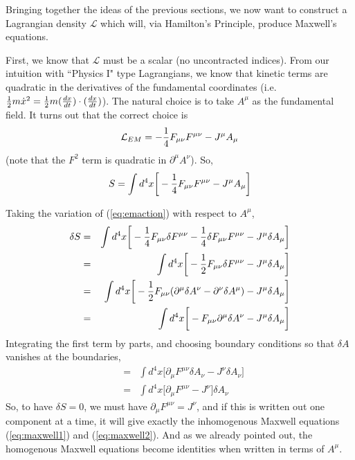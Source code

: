 \documentclass[12pt,epsf]{article}
\def\nolabel{\nonumber }
\def\nolabel{\nonumber }
\begin{document}
Bringing together the ideas of the previous sections, we now want to construct a
Lagrangian density $\mathcal{L}$ which will, via Hamilton's Principle,
produce Maxwell's equations.  

First, we know that $\mathcal{L}$ must be a scalar (no uncontracted
indices).  From our intuition with ``Physics I" type Lagrangians, we
know that kinetic terms are quadratic in the derivatives of the
fundamental coordinates (i.e. ${1\over 2} m\dot{x}^2 = {1\over 2} m
({dx \over dt})\cdot ({dx \over dt})$).  The natural choice is to take
$A^{\mu}$ as the fundamental field.  It turns out that the correct
choice is 
\begin{eqnarray}
\mathcal{L}_{EM} = -{1\over 4} F_{\mu \nu}F^{\mu \nu} - J^{\mu}A_{\mu}
\label{eq:emlagrangian}
\end{eqnarray}
(note that the $F^2$ term is quadratic in $\partial^{\mu}A^{\nu}$). 
So, 
\begin{eqnarray}
S = \int d^4x \bigg[-{1\over 4}F_{\mu \nu}F^{\mu \nu} -
J^{\mu}A_{\mu}\bigg] \label{eq:emaction}
\end{eqnarray}

Taking the variation of (\ref{eq:emaction}) with respect to
$A^{\mu}$, 
\begin{eqnarray}
\delta S &=&\int d^4x \bigg[-{1\over 4}F_{\mu \nu} \delta F^{\mu \nu} -
{1\over 4} \delta F_{\mu \nu}F^{\mu \nu} - J^{\mu} \delta A_{\mu}
\bigg] \nolabel \\
&=& \int d^4x \bigg[-{1\over 2}F_{\mu \nu}\delta F^{\mu \nu} - J^{\mu}
\delta A_{\mu}\bigg] \nolabel \\
&=&\int d^4x \bigg[-{1\over 2}F_{\mu \nu}(\partial^{\mu}\delta A^{\nu}
- \partial^{\nu}\delta A^{\mu}) - J^{\mu}\delta A_{\mu}\bigg] \nolabel
\\
&=&\int d^4x \bigg[-F_{\mu \nu} \partial^{\mu} \delta A^{\nu} -
J^{\mu}\delta A_{\mu}\bigg] \nolabel 
\end{eqnarray}
Integrating the first term by parts, and choosing boundary
conditions so that $\delta A$ vanishes at the boundaries, 
\begin{eqnarray}
&=& \int d^4x \bigg[\partial_{\mu}F^{\mu \nu}\delta A_{\nu} -
J^{\nu}\delta A_{\nu}\bigg] \nolabel \\
&=& \int d^4x \bigg[\partial_{\mu}F^{\mu \nu} - J^{\nu}\bigg] \delta
A_{\nu} \nolabel
\end{eqnarray}
So, to have $\delta S = 0$, we must have $\partial_{\mu}F^{\mu \nu} =
J^{\nu}$, and if this is written out one component at a time, it will
give exactly the inhomogenous Maxwell equations (\ref{eq:maxwell1}) and
(\ref{eq:maxwell2}).  And as we already pointed out, the homogenous
Maxwell equations become identities when written in terms of $A^{\mu}$. 
\end{document}
